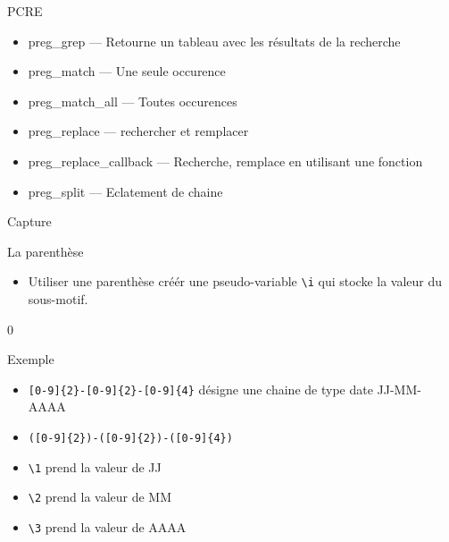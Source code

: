 \begin{frame}[containsverbatim]{\ftitle}
\def\blocktitle{PCRE}
\begin{block}{\blocktitle}
\begin{itemize}
\item preg\_grep — Retourne un tableau avec les résultats de la recherche
\item preg\_match — Une seule occurence
\item preg\_match\_all — Toutes occurences
\item preg\_replace — rechercher et remplacer
\item preg\_replace\_callback — Recherche, remplace en utilisant une fonction
\item preg\_split — Eclatement de chaine
\end{itemize}
\end{block}
\end{frame}

\def\ftitle{Capture}
\begin{frame}[containsverbatim]{\ftitle}
\def\blocktitle{La parenthèse}
\begin{block}{\blocktitle}
\begin{itemize}
\item Utiliser une parenthèse créér une pseudo-variable \verb!\i! qui stocke la valeur du sous-motif. %
\end{itemize}
\end{block}0
\def\blocktitle{Exemple}
\begin{block}{\blocktitle}
\begin{itemize}
\item \verb![0-9]{2}-[0-9]{2}-[0-9]{4}! désigne une chaine de type date JJ-MM-AAAA
\item \verb!([0-9]{2})-([0-9]{2})-([0-9]{4})! 
\item \verb!\1! prend la valeur de JJ
\item \verb!\2! prend la valeur de MM
\item \verb!\3! prend la valeur de AAAA %
\end{itemize}
\end{block}
\end{frame}


